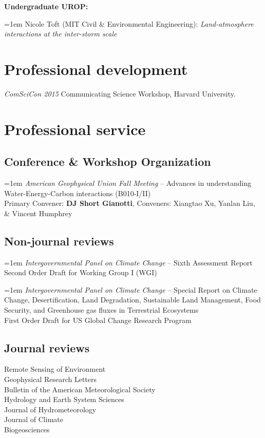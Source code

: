 \documentclass[10pt, a4paper]{article}
\renewcommand{\emph}[1]{\textit{#1}}
\newcommand{\lbr}{\vspace*{12pt}}
\newcommand{\years}[1]{\mbox{}\marginnote{\scriptsize #1}} %
\begin{document}
\textbf{ Undergraduate UROP:}
\par \years{2019} \hangindent=1em Nicole Toft (MIT Civil \& Environmental Engineering): \emph{Land-atmosphere interactions at the inter-storm scale} \lbr

\section*{Professional development}
\years{2015}\emph{ComSciCon 2015} Communicating Science Workshop, Harvard University.\\

\section*{Professional service}

\subsection*{Conference \& Workshop Organization}
\years{2021}\hangindent=1em \emph{American Geophysical Union Fall Meeting} -- Advances in understanding Water-Energy-Carbon interactions (B010-I/II)\\ 
Primary Convener: \textbf{DJ Short Gianotti}, Conveners: Xiangtao Xu, Yanlan Liu, \& Vincent Humphrey
		
\subsection*{Non-journal reviews}
\years{2020}\hangindent=1em \emph{Intergovernmental Panel on Climate Change} -- Sixth Assessment Report \\
Second Order Draft for Working Group I (WGI)
		
\years{2018} \hangindent=1em \emph{Intergovernmental Panel on Climate Change} -- Special Report on Climate Change, Desertification, Land Degradation, Sustainable Land Management, Food Security, and Greenhouse gas fluxes in Terrestrial Ecosystems \\
First Order Draft for US Global Change Research Program

\subsection*{Journal reviews}
Remote Sensing of Environment\\
Geophysical Research Letters\\
Bulletin of the American Meteorological Society\\
Hydrology and Earth System Sciences\\
Journal of Hydrometeorology\\
Journal of Climate\\
Biogeosciences
\end{document}
